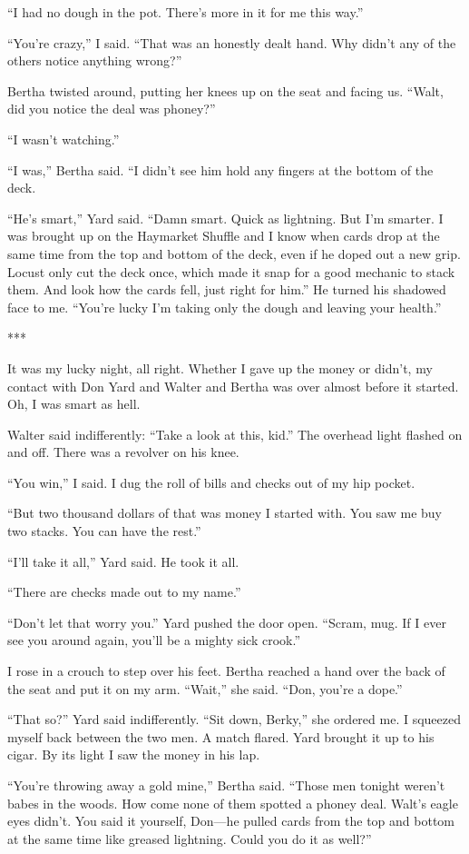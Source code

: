 {“I had no dough in the pot. There’s more in it for me this way.”

“You’re crazy,” I said. “That was an honestly dealt hand. Why didn’t any of the others notice anything wrong?”

Bertha twisted around, putting her knees up on the seat and facing us. “Walt, did you notice the deal was phoney?”

“I wasn’t watching.”

“I was,” Bertha said. “I didn’t see him hold any fingers at the bottom of the deck.

“He’s smart,” Yard said. “Damn smart. Quick as lightning. But I’m smarter. I was brought up on the Haymarket Shuffle and I know when cards drop at the same time from the top and bottom of the deck, even if he doped out a new grip. Locust only cut the deck once, which made it snap for a good mechanic to stack them. And look how the cards fell, just right for him.” He turned his shadowed face to me. “You’re lucky I’m taking only the dough and leaving your health.”

***

It was my lucky night, all right. Whether I gave up the money or didn’t, my contact with Don Yard and Walter and Bertha was over almost before it started. Oh, I was smart as hell.

Walter said indifferently: “Take a look at this, kid.” The overhead light flashed on and off. There was a revolver on his knee.

“You win,” I said. I dug the roll of bills and checks out of my hip pocket.

“But two thousand dollars of that was money I started with. You saw me buy two stacks. You can have the rest.”

“I’ll take it all,” Yard said. He took it all.

“There are checks made out to my name.”

“Don’t let that worry you.” Yard pushed the door open. “Scram, mug. If I ever see you around again, you’ll be a mighty sick crook.”

I rose in a crouch to step over his feet. Bertha reached a hand over the back of the seat and put it on my arm. “Wait,” she said. “Don, you’re a dope.”

“That so?” Yard said indifferently. “Sit down, Berky,” she ordered me. I squeezed myself back between the two men. A match flared. Yard brought it up to his cigar. By its light I saw the money in his lap.

“You’re throwing away a gold mine,” Bertha said. “Those men tonight weren’t babes in the woods. How come none of them spotted a phoney deal. Walt’s eagle eyes didn’t. You said it yourself, Don—he pulled cards from the top and bottom at the same time like greased lightning. Could you do it as well?”

}
